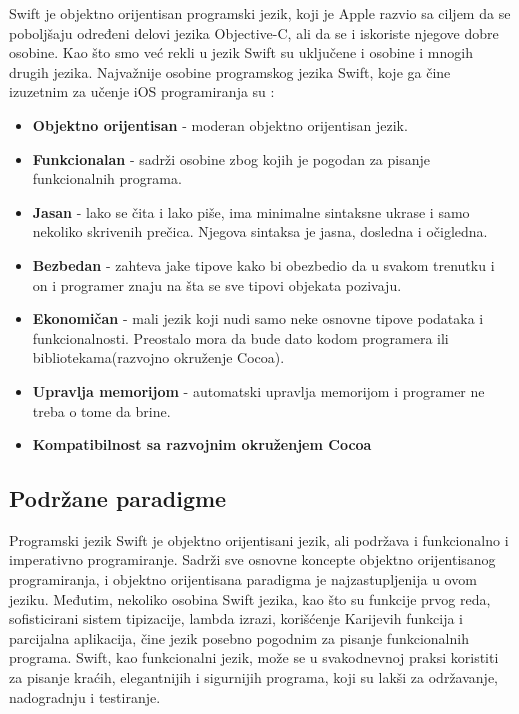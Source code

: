 \documentclass[a4paper]{article}
\begin{document}
Swift je objektno orijentisan programski jezik, koji je Apple razvio sa ciljem da 
se poboljšaju određeni delovi jezika Objective-C, ali da se i iskoriste njegove
dobre osobine. Kao što smo već rekli u jezik Swift su uključene i osobine i mnogih drugih jezika. Najvažnije osobine programskog jezika Swift, koje ga čine izuzetnim za učenje iOS programiranja su \cite{swift_programming}:
\begin{itemize}
\item\textbf{Objektno orijentisan} - moderan objektno orijentisan jezik.
\item\textbf{Funkcionalan} - sadrži osobine zbog kojih je pogodan za pisanje funkcionalnih programa.
\item\textbf{Jasan} - lako se čita i lako piše, ima minimalne sintaksne ukrase i samo nekoliko skrivenih prečica. Njegova sintaksa je jasna, dosledna i očigledna.
\item\textbf{Bezbedan} - zahteva jake tipove kako bi obezbedio da u svakom trenutku i on i programer znaju na šta se sve tipovi objekata pozivaju.
\item\textbf{Ekonomičan} - mali jezik koji nudi samo neke osnovne tipove podataka i funkcionalnosti. Preostalo mora da bude dato kodom programera ili bibliotekama(razvojno okruženje Cocoa).
\item\textbf{Upravlja memorijom} - automatski upravlja memorijom i programer ne treba o tome da brine.
\item\textbf{Kompatibilnost sa razvojnim okruženjem Cocoa}
\end{itemize}

\subsection{Podržane paradigme}
\label{subsec:podnaslovParadigma}

Programski jezik Swift je objektno orijentisani jezik, ali podržava i funkcionalno i imperativno
programiranje. Sadrži sve osnovne koncepte objektno orijentisanog programiranja, i objektno orijentisana paradigma je najzastupljenija u ovom jeziku. Međutim, nekoliko osobina Swift jezika, kao što su funkcije prvog reda, sofisticirani sistem tipizacije, lambda izrazi, korišćenje Karijevih funkcija i parcijalna aplikacija, čine jezik posebno pogodnim za pisanje funkcionalnih programa. Swift, kao funkcionalni jezik, može se u svakodnevnoj praksi koristiti za pisanje kraćih, elegantnijih i sigurnijih programa, koji su lakši za održavanje, nadogradnju i testiranje.
\end{document}
